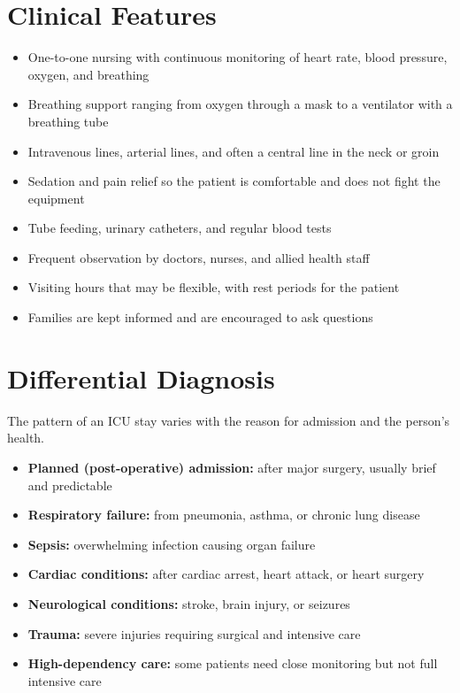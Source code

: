 \section*{Clinical Features}
\begin{itemize}
    \item One-to-one nursing with continuous monitoring of heart rate, blood pressure, oxygen, and breathing
    \item Breathing support ranging from oxygen through a mask to a ventilator with a breathing tube
    \item Intravenous lines, arterial lines, and often a central line in the neck or groin
    \item Sedation and pain relief so the patient is comfortable and does not fight the equipment
    \item Tube feeding, urinary catheters, and regular blood tests
    \item Frequent observation by doctors, nurses, and allied health staff
    \item Visiting hours that may be flexible, with rest periods for the patient
    \item Families are kept informed and are encouraged to ask questions
\end{itemize}

\section*{Differential Diagnosis}
The pattern of an ICU stay varies with the reason for admission and the person's health.
\begin{itemize}
    \item \textbf{Planned (post-operative) admission:} after major surgery, usually brief and predictable
    \item \textbf{Respiratory failure:} from pneumonia, asthma, or chronic lung disease
    \item \textbf{Sepsis:} overwhelming infection causing organ failure
    \item \textbf{Cardiac conditions:} after cardiac arrest, heart attack, or heart surgery
    \item \textbf{Neurological conditions:} stroke, brain injury, or seizures
    \item \textbf{Trauma:} severe injuries requiring surgical and intensive care
    \item \textbf{High-dependency care:} some patients need close monitoring but not full intensive care
\end{itemize}


